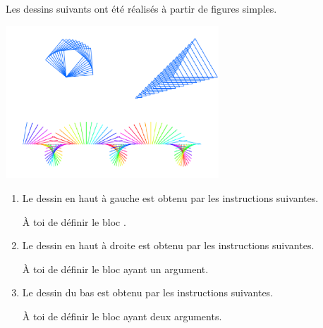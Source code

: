 \documentclass[class=report,crop=false, 12pt]{standalone}
\begin{document}
\begin{activite}

Les dessins suivants ont été réalisés à partir de figures simples.

\begin{center}
  \includegraphics[width=0.6\textwidth]{ecran-11-ex3} 
\end{center}

\begin{enumerate}
  \item Le dessin en haut à gauche est obtenu par les instructions suivantes.
\begin{center}
\begin{scratch}
  {
  }
\end{scratch}
\end{center} 

\`A toi de définir le bloc .


  
  \item Le dessin en haut à droite est obtenu par les instructions suivantes.
\begin{center}
\begin{scratch}
  {
  }
\end{scratch}
\end{center} 

\`A toi de définir le bloc  ayant un argument.

   
 
  \item Le dessin du bas est obtenu par les instructions suivantes.
\begin{center}
\begin{scratch}
  {
  }
\end{scratch}
\end{center} 

\`A toi de définir le bloc  ayant deux arguments.
  
  
\end{enumerate}
  
\end{activite}
\end{document}
